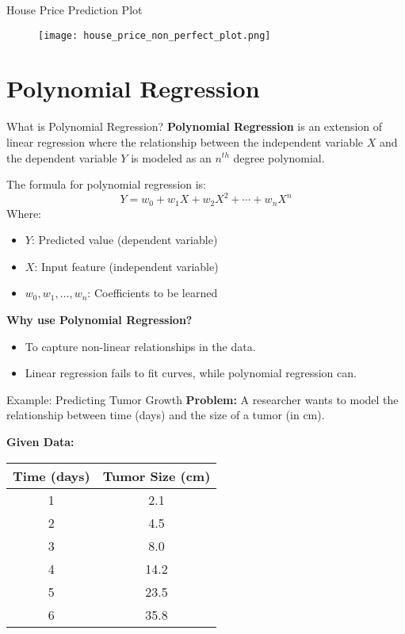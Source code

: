 \documentclass[serif, aspectratio=169]{beamer}
\begin{document}
\begin{frame}{House Price Prediction Plot}
    \begin{figure}[h]
        \centering
        \texttt{[image: house\_price\_non\_perfect\_plot.png]} 
    \end{figure}
\end{frame}

\section{Polynomial Regression}

\begin{frame}{What is Polynomial Regression?}
\textbf{Polynomial Regression} is an extension of linear regression where the relationship between the independent variable $X$ and the dependent variable $Y$ is modeled as an $n^{th}$ degree polynomial.

\vspace{0.5cm}
The formula for polynomial regression is:
\begin{equation}
Y = w_0 + w_1 X + w_2 X^2 + \cdots + w_n X^n
\end{equation}
Where:
\begin{itemize}
    \item $Y$: Predicted value (dependent variable)
    \item $X$: Input feature (independent variable)
    \item $w_0, w_1, \dots, w_n$: Coefficients to be learned
\end{itemize}
\textbf{Why use Polynomial Regression?}
\begin{itemize}
    \item To capture non-linear relationships in the data.
    \item Linear regression fails to fit curves, while polynomial regression can.
\end{itemize}
\end{frame}

\begin{frame}{Example: Predicting Tumor Growth}
\textbf{Problem:} A researcher wants to model the relationship between time (days) and the size of a tumor (in cm).

\textbf{Given Data:}
\begin{center}
\begin{tabular}{|c|c|}
\hline
Time (days) & Tumor Size (cm) \\
\hline
1 & 2.1 \\
2 & 4.5 \\
3 & 8.0 \\
4 & 14.2 \\
5 & 23.5 \\
6 & 35.8 \\
\hline
\end{tabular}
\end{center}
\end{frame}
\end{document}

